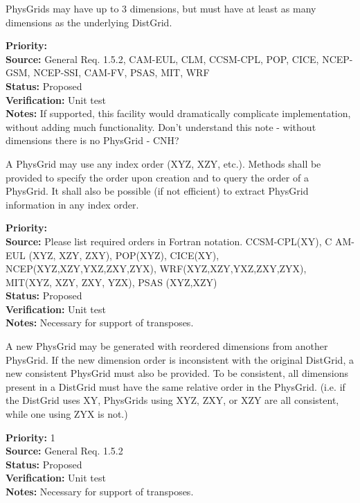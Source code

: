 PhysGrids may have up to 3 dimensions, but must have at least as many dimensions as the
underlying DistGrid. 
\begin{reqlist}
{\bf Priority:}  \\
{\bf Source:} General Req. 1.5.2, CAM-EUL, CLM, CCSM-CPL, POP, CICE, NCEP-GSM, NCEP-SSI,
              CAM-FV, PSAS, MIT, WRF \\
{\bf Status:} Proposed \\
{\bf Verification:} Unit test\\
{\bf Notes:} If supported, this facility would dramatically complicate implementation,
without adding much functionality. Don't understand this note - without dimensions
there is no PhysGrid - CNH?
\end{reqlist}

A PhysGrid may use any index order (XYZ, XZY, etc.).  Methods shall be provided to
specify the order upon creation and to query the order of a PhysGrid.  It shall
also be possible (if not efficient) to extract PhysGrid information in any index
order.
\begin{reqlist}
{\bf Priority:}  \\
{\bf Source:} Please list required orders in Fortran notation. CCSM-CPL(XY), C
AM-EUL (XYZ, XZY, ZXY), POP(XYZ), CICE(XY), NCEP(XYZ,XZY,YXZ,ZXY,ZYX), 
WRF(XYZ,XZY,YXZ,ZXY,ZYX),
MIT(XYZ, XZY, ZXY, YZX),
PSAS (XYZ,XZY) \\
{\bf Status:} Proposed \\
{\bf Verification:} Unit test\\
{\bf Notes:} Necessary for support of transposes.
\end{reqlist}

A new PhysGrid may be generated with reordered dimensions from another PhysGrid.
If the new dimension order is inconsistent with the original DistGrid, a new
consistent PhysGrid must also be provided.  To be consistent, all dimensions present
in a DistGrid must have the same relative order in the PhysGrid.  (i.e. if the
DistGrid uses XY, PhysGrids using XYZ, ZXY, or XZY are all consistent, while one using
ZYX is not.)
\begin{reqlist}
{\bf Priority:} 1 \\
{\bf Source:} General Req. 1.5.2 \\
{\bf Status:} Proposed \\
{\bf Verification:} Unit test\\
{\bf Notes:} Necessary for support of transposes.
\end{reqlist}

